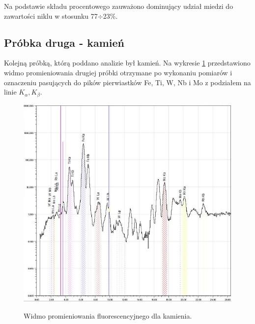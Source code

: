 \documentclass[11pt]{article}
\begin{document}
Na podstawie składu procentowego zauważono dominujący udział miedzi do zawartości niklu w stosunku 77$\div$23\%.\\


\subsection*{Próbka druga - kamień}  

Kolejną próbką, którą poddano analizie był kamień. Na wykresie \ref{wykres_2} przedstawiono widmo promieniowania drugiej próbki otrzymane po wykonaniu pomiarów i oznaczeniu pasujących do pików pierwiastków Fe, Ti, W, Nb i Mo z podziałem na linie $K_{\alpha}, K_{\beta}$.\\
\begin{figure}[h!]
\begin{center}
\includegraphics[scale=0.6]{kamyk_biale.png}\\
\caption{Widmo promieniowania fluorescencyjnego dla kamienia.}
\label{wykres_2}
\end{center}
\end{figure}
\end{document}
